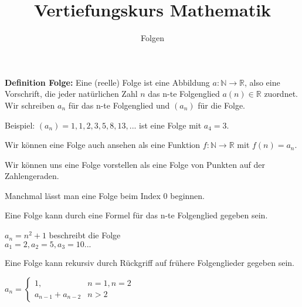 \usepackage[ngerman]{babel}
\usepackage[utf8]{inputenc}
\usepackage{amsmath}
\usepackage{amssymb}
\usepackage{listings} 
\usepackage{stmaryrd}
\lstset{language=Python, tabsize=4, showstringspaces=false,basicstyle=\footnotesize,mathescape=true} 
\usepackage{mathtools}
\usepackage{ulem}
\usepackage{tikz}

\parskip 10pt




\title{Vertiefungskurs Mathematik}   
\author{Folgen} 
\date{}
\frame{\titlepage} 

\begin{frame}[fragile]


\textbf{Definition Folge:} Eine (reelle) Folge ist eine Abbildung $a: \mathbb{N} \rightarrow \mathbb{R}$, also
eine Vorschrift, die jeder natürlichen Zahl $n$ das n-te Folgenglied $a(n) \in \mathbb{R}$ zuordnet. \pause
Wir schreiben $a_n$ für das n-te Folgenglied und $(a_n)$ für die Folge. \\ \pause
\bigskip

Beispiel: $(a_n) = 1, 1, 2, 3, 5, 8, 13, ... $ ist eine Folge mit $a_4 = 3$. \pause

Wir können eine Folge auch ansehen als eine Funktion $f: \mathbb{N} \rightarrow \mathbb{R}$ mit $f(n) = a_n$. \pause

Wir können uns eine Folge vorstellen als eine Folge von Punkten auf der Zahlengeraden. \pause

Manchmal lässt man eine Folge beim Index 0 beginnen.
\end{frame}


\begin{frame}[fragile]
Eine Folge kann durch eine Formel für das n-te Folgenglied gegeben sein. \\ \bigskip \pause

 $a_n = n^2 +1$ \quad beschreibt die Folge  \pause \\ $a_1 = 2, a_2 = 5, a_3 = 10 ...$ \\
\bigskip  \pause

Eine Folge kann rekursiv durch Rückgriff auf frühere Folgenglieder gegeben sein. \\ \bigskip 

$a_n=\begin{cases}
 1,  & n=1, n=2 \\
 a_{n-1}+a_{n-2} & n > 2 
\end{cases} $
 
\end{frame}
 

